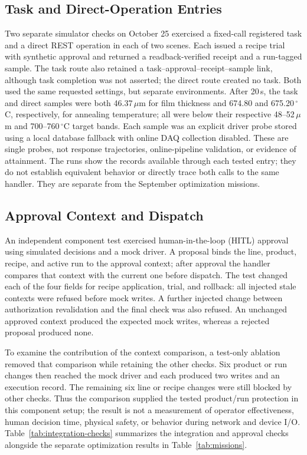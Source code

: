 \subsection{Task and Direct-Operation Entries}
Two separate simulator checks on October 25 exercised a fixed-call registered
task and a direct REST operation in each of two scenes. Each issued a recipe
trial with synthetic approval and returned a readback-verified receipt and a
run-tagged sample. The task route also retained a task--approval--receipt--sample
link, although task completion was not asserted; the direct route created no
task. Both used the same requested settings, but separate environments. After
20\,s, the task and direct samples were both 46.37\,$\mu$m for film thickness
and 674.80 and 675.20\,$^{\circ}$C, respectively, for annealing temperature;
all were below their respective 48--52\,$\mu$m and 700--760\,$^{\circ}$C
target bands. Each sample was an explicit driver probe stored using a local
database fallback with online DAQ collection disabled. These are single probes,
not response trajectories, online-pipeline validation, or evidence of
attainment. The runs show the records
available through each tested entry; they do not establish equivalent
behavior or directly trace both calls to the same handler. They are separate
from the September optimization missions.

\subsection{Approval Context and Dispatch}
An independent component test exercised human-in-the-loop (HITL) approval
using simulated decisions and a mock driver. A proposal binds the line,
product, recipe, and active run to the approval context; after approval the
handler compares that context with the current one before dispatch. The test
changed each of the four fields for recipe application, trial, and rollback:
all injected stale contexts were refused before mock writes. A further injected
change between authorization revalidation and the final check was also
refused. An unchanged approved context produced the expected mock writes,
whereas a rejected proposal produced none.

To examine the contribution of the context comparison, a test-only ablation
removed that comparison while retaining the other checks. Six product or run
changes then reached the mock driver and each produced two writes and an
execution record. The remaining six line or recipe changes were still blocked
by other checks. Thus the comparison supplied the tested product/run
protection in this component setup; the result is not a measurement of
operator effectiveness, human decision time, physical safety, or behavior
during network and device I/O.
Table~\ref{tab:integration-checks} summarizes the integration and approval
checks alongside the separate optimization results in Table~\ref{tab:missions}.

